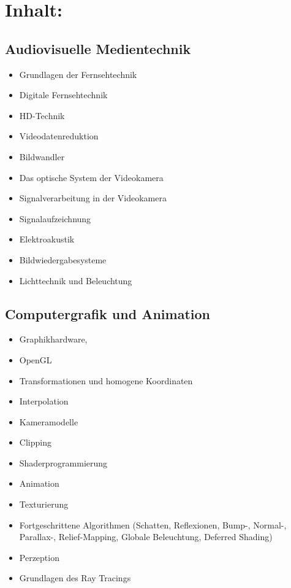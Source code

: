 \section{Inhalt:}\label{inhalt-29}

\subsection{Audiovisuelle
Medientechnik}\label{audiovisuelle-medientechnik-1}

\begin{itemize}
\tightlist
\item
  Grundlagen der Fernsehtechnik
\item
  Digitale Fernsehtechnik
\item
  HD-Technik
\item
  Videodatenreduktion
\item
  Bildwandler
\item
  Das optische System der Videokamera
\item
  Signalverarbeitung in der Videokamera
\item
  Signalaufzeichnung
\item
  Elektroakustik
\item
  Bildwiedergabesysteme
\item
  Lichttechnik und Beleuchtung
\end{itemize}

\subsection{Computergrafik und
Animation}\label{computergrafik-und-animation-1}

\begin{itemize}
\tightlist
\item
  Graphikhardware,
\item
  OpenGL
\item
  Transformationen und homogene Koordinaten
\item
  Interpolation
\item
  Kameramodelle
\item
  Clipping
\item
  Shaderprogrammierung
\item
  Animation
\item
  Texturierung
\item
  Fortgeschrittene Algorithmen (Schatten, Reflexionen, Bump-, Normal-,
  Parallax-, Relief-Mapping, Globale Beleuchtung, Deferred Shading)
\item
  Perzeption
\item
  Grundlagen des Ray Tracings
\end{itemize}

